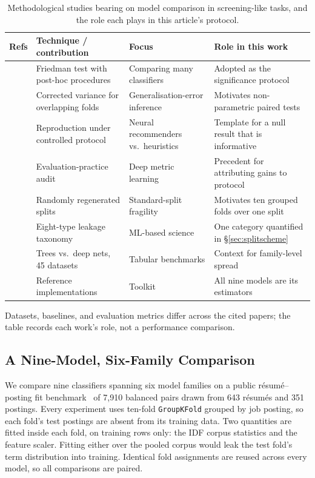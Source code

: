 \begin{table}[t]
\caption{Methodological studies bearing on model comparison in screening-like
tasks, and the role each plays in this article's protocol.}
\label{tab:ml-studies}
\small
\begin{tabular}{@{}p{1.5cm}p{4.2cm}p{4.4cm}p{5.0cm}@{}}
\toprule
Refs & Technique / contribution & Focus & Role in this work \\
\midrule
\cite{demsar2006statistical} & Friedman test with post-hoc procedures &
Comparing many classifiers & Adopted as the significance protocol \\
\cite{nadeau2003inference} & Corrected variance for overlapping folds &
Generalisation-error inference & Motivates non-parametric paired tests \\
\cite{dacrema2019progress} & Reproduction under controlled protocol & Neural
recommenders vs.\ heuristics & Template for a null result that is informative \\
\cite{musgrave2020reality} & Evaluation-practice audit & Deep metric learning &
Precedent for attributing gains to protocol \\
\cite{gorman2019splits} & Randomly regenerated splits & Standard-split fragility
& Motivates ten grouped folds over one split \\
\cite{kapoor2023leakage} & Eight-type leakage taxonomy & ML-based science &
One category quantified in \S\ref{sec:splitscheme} \\
\cite{grinsztajn2022tabular} & Trees vs.\ deep nets, 45 datasets & Tabular
benchmarks & Context for family-level spread \\
\cite{pedregosa2011scikit} & Reference implementations & Toolkit & All nine
models are its estimators \\
\bottomrule
\end{tabular}
\vspace{2pt}
\footnotesize
Datasets, baselines, and evaluation metrics differ across the cited papers; the
table records each work's role, not a performance comparison.
\end{table}

\subsection{A Nine-Model, Six-Family Comparison}
\label{sec:ninemodel}

We compare nine classifiers spanning six model families on a public
résumé--posting fit benchmark~\cite{resumejobfit2024} of 7{,}910 balanced pairs
drawn from 643 résumés and 351 postings. Every experiment uses ten-fold
\texttt{GroupKFold} grouped by job posting, so each fold's test postings are
absent from its training data. Two quantities are fitted inside each fold, on training rows only: the IDF corpus statistics and the feature scaler. Fitting either over the pooled corpus would leak the test fold's term distribution into training. Identical fold
assignments are reused across every model, so all comparisons are paired.

